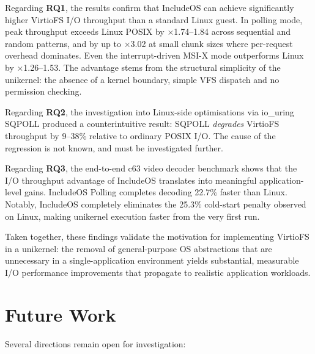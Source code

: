 \documentclass[12pt, a4paper, oneside]{report}
\begin{document}
Regarding \textbf{RQ1}, the results confirm that IncludeOS can achieve
significantly higher VirtioFS I/O throughput than a standard Linux guest.  In
polling mode, peak throughput exceeds Linux POSIX by $\times$1.74--1.84 across
sequential and random patterns, and by up to $\times$3.02 at small chunk sizes
where per-request overhead dominates.  Even the interrupt-driven MSI-X mode
outperforms Linux by $\times$1.26--1.53.  The advantage stems from the structural
simplicity of the unikernel: the absence of a kernel boundary, simple VFS dispatch and no permission checking.

Regarding \textbf{RQ2}, the investigation into Linux-side optimisations via
io\_uring SQPOLL produced a counterintuitive result: SQPOLL \emph{degrades}
VirtioFS throughput by 9--38\% relative to ordinary POSIX I/O. The cause of the regression is not known, and must be investigated further.

Regarding \textbf{RQ3}, the end-to-end c63 video decoder benchmark shows that
the I/O throughput advantage of IncludeOS translates into meaningful
application-level gains.  IncludeOS Polling completes decoding 22.7\% faster
than Linux. Notably, IncludeOS completely eliminates the 25.3\% cold-start penalty observed on Linux, making unikernel execution faster from the very first run.



Taken together, these findings validate the motivation for implementing VirtioFS
in a unikernel: the removal of general-purpose OS abstractions that are
unnecessary in a single-application environment yields substantial, measurable
I/O performance improvements that propagate to realistic application workloads.

\section{Future Work}

Several directions remain open for investigation:
\end{document}
